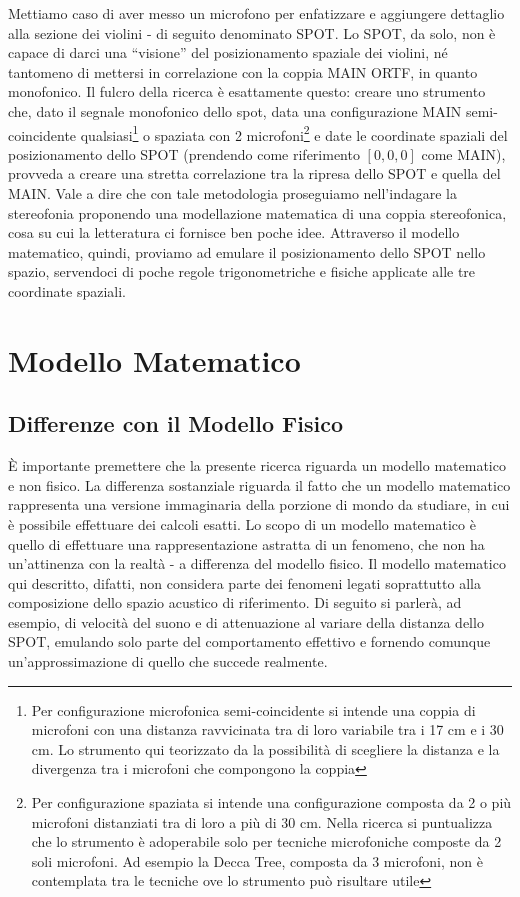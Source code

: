 \documentclass{article}
\begin{document}
    Mettiamo caso di aver messo un microfono per enfatizzare e aggiungere dettaglio alla sezione dei violini - di seguito denominato SPOT. Lo SPOT, da solo, non è capace di darci una ``visione'' del posizionamento spaziale dei violini, né tantomeno di mettersi in correlazione con la coppia MAIN ORTF, in quanto monofonico. Il fulcro della ricerca è esattamente questo: creare uno strumento che, dato il segnale monofonico dello spot, data una configurazione MAIN semi-coincidente qualsiasi\footnote{Per configurazione microfonica semi-coincidente si intende una coppia di microfoni con una distanza ravvicinata tra di loro variabile tra i 17 cm e i 30 cm. Lo strumento qui teorizzato da la possibilità di scegliere la distanza e la divergenza tra i microfoni che compongono la coppia} o spaziata con 2 microfoni\footnote{Per configurazione spaziata si intende una configurazione composta da 2 o più microfoni distanziati tra di loro a più di 30 cm. Nella ricerca si puntualizza che lo strumento è adoperabile solo per tecniche microfoniche composte da 2 soli microfoni. Ad esempio la Decca Tree, composta da 3 microfoni, non è contemplata tra le tecniche ove lo strumento può risultare utile} e date le coordinate spaziali del posizionamento dello SPOT (prendendo come riferimento $[0,0,0]$ come MAIN), provveda a creare una stretta correlazione tra la ripresa dello SPOT e quella del MAIN. Vale a dire che con tale metodologia proseguiamo nell'indagare la stereofonia proponendo una modellazione matematica di una coppia stereofonica, cosa su cui la letteratura ci fornisce ben poche idee. Attraverso il modello matematico, quindi, proviamo ad emulare il posizionamento dello SPOT nello spazio, servendoci di poche regole trigonometriche e fisiche applicate alle tre coordinate spaziali.

\section{Modello Matematico}

    \subsection{Differenze con il Modello Fisico}
    È importante premettere che la presente ricerca riguarda un modello matematico e non fisico. La differenza sostanziale riguarda il fatto che un modello matematico rappresenta una versione immaginaria della porzione di mondo da studiare, in cui è possibile effettuare dei calcoli esatti. Lo scopo di un modello matematico è quello di effettuare una rappresentazione astratta di un fenomeno, che non ha un'attinenza con la realtà - a differenza del modello fisico.     
     Il modello matematico qui descritto, difatti, non considera parte dei fenomeni legati soprattutto alla composizione dello spazio acustico di riferimento. Di seguito si parlerà, ad esempio, di velocità del suono e di attenuazione al variare della distanza dello SPOT, emulando solo parte del comportamento effettivo e fornendo comunque un'approssimazione di quello che succede realmente.
\end{document}
